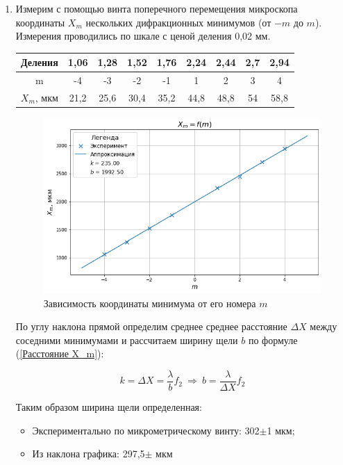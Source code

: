 \documentclass[a4paper, 12pt]{article}
\begin{document}
\begin{enumerate}
	\item Измерим с помощью винта поперечного перемещения микроскопа координаты $X_m$ нескольких дифракционных минимумов (от $-m$ до $m$). Измерения проводились по шкале с ценой деления 0,02 мм.

	\begin{center}
		\begin{tabular}{|c|c|c|c|c|c|c|c|c|}
			\hline
			Деления   & 1,06 & 1,28 & 1,52 & 1,76 & 2,24 & 2,44 & 2,7 & 2,94 \\ \hline
			m         & -4   & -3   & -2   & -1   & 1    & 2    & 3   & 4    \\ \hline
			$X_m$, мкм & 21,2 & 25,6 & 30,4 & 35,2 & 44,8 & 48,8 & 54  & 58,8 \\ \hline
		\end{tabular}
	\end{center}

	\begin{figure}[h!]
		\begin{center}
		\includegraphics[width=1\textwidth]{graph2.png}
		\caption{Зависимость координаты минимума от его номера $m$}
		\end{center}
	\end{figure}

	По углу наклона прямой определим среднее среднее расстояние $\Delta X$ между соседними минимумами и рассчитаем ширину щели $b$ по формуле (\ref{Расстояние X_m}):

\[k = \Delta X = \dfrac{\lambda}{b}f_2~\Rightarrow~b=\dfrac{\lambda}{\Delta X}f_2\]

Таким образом ширина щели определенная:
\begin{itemize}
	\item Экспериментально по микрометрическому винту: 302$\pm$1 мкм;
	\item Из наклона графика: 297,5$\pm$ мкм
\end{itemize}

\end{enumerate}
\end{document}
